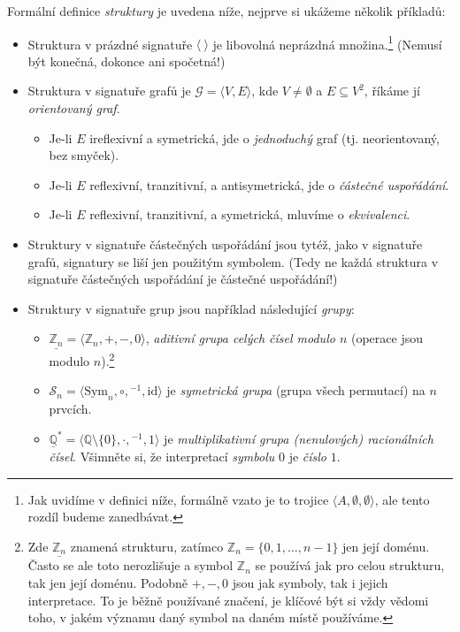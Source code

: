\begin{example} \label{example:signatures}
    Formální definice \emph{struktury} je uvedena níže, nejprve si ukážeme několik příkladů:
\begin{itemize}
    \item Struktura v prázdné signatuře $\langle\ \rangle$ je libovolná neprázdná množina.\footnote{Jak uvidíme v definici níže, formálně vzato je to trojice $\langle A,\emptyset,\emptyset\rangle$, ale tento rozdíl budeme zanedbávat.} (Nemusí být konečná, dokonce ani spočetná!)
    \item Struktura v signatuře grafů je $\mathcal G=\langle V,E\rangle$, kde $V\neq\emptyset$ a $E\subseteq V^2$, říkáme jí \emph{orientovaný graf}. 
    \begin{itemize}
        \item Je-li $E$ ireflexivní a symetrická, jde o \emph{jednoduchý} graf (tj. neorientovaný, bez smyček).
        \item Je-li $E$ reflexivní, tranzitivní, a antisymetrická, jde o \emph{částečné uspořádání}.
        \item Je-li $E$ reflexivní, tranzitivní, a symetrická, mluvíme o \emph{ekvivalenci}.
    \end{itemize}
    \item Struktury v signatuře částečných uspořádání jsou tytéž, jako v signatuře grafů, signatury se liší jen použitým symbolem. (Tedy ne každá struktura v signatuře částečných uspořádání je částečné uspořádání!)
    \item Struktury v signatuře grup jsou například následující \emph{grupy}:
    \begin{itemize}
        \item $\underline{\mathbb Z_n}=\langle\mathbb Z_n,+,-,0\rangle$, \emph{aditivní grupa celých čísel modulo $n$} (operace jsou modulo $n$).\footnote{Zde $\underline{\mathbb Z_n}$ znamená strukturu, zatímco $\mathbb Z_n=\{0,1,\dots,n-1\}$ jen její doménu. Často se ale toto nerozlišuje a symbol $\mathbb Z_n$ se používá jak pro celou strukturu, tak jen její doménu. Podobně $+,-,0$ jsou jak symboly, tak i jejich interpretace. To je běžně používané značení, je klíčové být si vždy vědomi toho, v jakém významu daný symbol na daném místě používáme.}
        \item $\mathcal S_n=\langle \mathrm{Sym}_n,\circ,{}^{-1},\mathrm{id}\rangle$ je \emph{symetrická grupa} (grupa všech permutací) na $n$ prvcích.
        \item $\underline{\mathbb Q}^*=\langle \mathbb Q\setminus\{0\},\cdot,{}^{-1},1\rangle$ je \emph{multiplikativní grupa (nenulových) racionálních čísel}. Všimněte si, že interpretací \emph{symbolu} $0$ je \emph{číslo} $1$.

\end{itemize}
\end{itemize}
\end{example}
